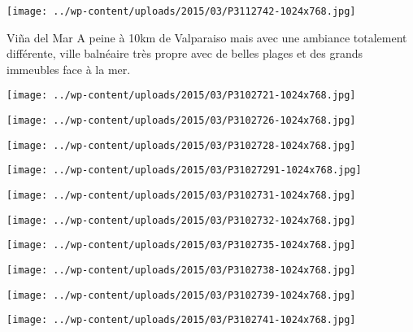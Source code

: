  \newline
 \newline
\centerline{\texttt{[image: ../wp-content/uploads/2015/03/P3112742-1024x768.jpg]} } 
 \newline
 Viña del Mar \newline
 A peine à 10km de Valparaiso mais avec une ambiance totalement différente, ville balnéaire très propre avec de belles plages et des grands immeubles face à la mer. \newline
 \newline
\centerline{\texttt{[image: ../wp-content/uploads/2015/03/P3102721-1024x768.jpg]} } 
 \newline
\centerline{\texttt{[image: ../wp-content/uploads/2015/03/P3102726-1024x768.jpg]} } 
 \newline
\centerline{\texttt{[image: ../wp-content/uploads/2015/03/P3102728-1024x768.jpg]} } 
 \newline
\centerline{\texttt{[image: ../wp-content/uploads/2015/03/P31027291-1024x768.jpg]} } 
 \newline
\centerline{\texttt{[image: ../wp-content/uploads/2015/03/P3102731-1024x768.jpg]} } 
 \newline
\centerline{\texttt{[image: ../wp-content/uploads/2015/03/P3102732-1024x768.jpg]} } 
 \newline
\centerline{\texttt{[image: ../wp-content/uploads/2015/03/P3102735-1024x768.jpg]} } 
 \newline
\centerline{\texttt{[image: ../wp-content/uploads/2015/03/P3102738-1024x768.jpg]} } 
 \newline
\centerline{\texttt{[image: ../wp-content/uploads/2015/03/P3102739-1024x768.jpg]} } 
 \newline
\centerline{\texttt{[image: ../wp-content/uploads/2015/03/P3102741-1024x768.jpg]} } 
 \newline

\newpage
 
